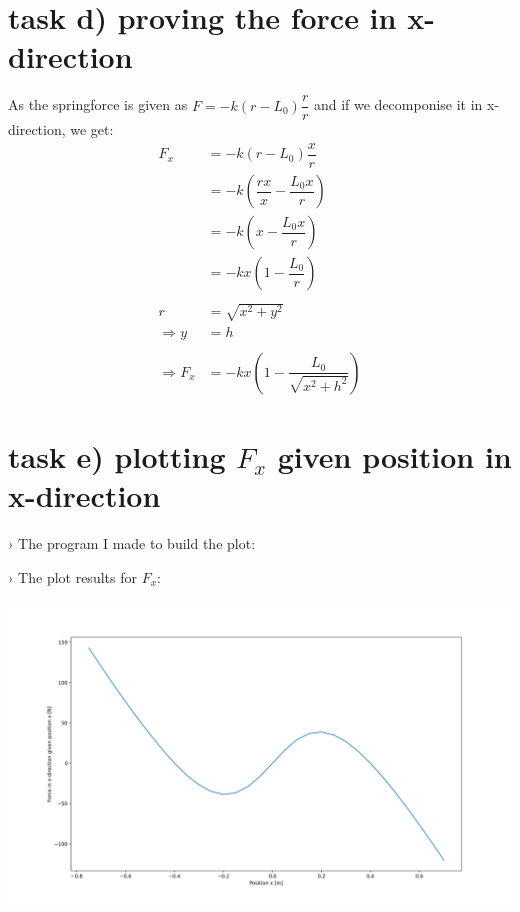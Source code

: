 \documentclass{article}
\begin{document}
    \section*{task d) proving the force in x-direction}
    As the springforce is given as \(F = -k(r-L_0)\dfrac{r}{r}\) and if we decomponise it in 
    x-direction, we get:
    \begin{equation*}
        \begin{split}
            F_x &= -k(r-L_0)\dfrac{x}{r} \\
                &= -k(\dfrac{rx}{x}-\dfrac{L_0x}{r}) \\
                &= -k(x-\dfrac{L_0x}{r}) \\
                &= -kx(1-\dfrac{L_0}{r}) \\
                \\
                r &= \sqrt{x^2 + y^2} \\
                \Rightarrow y &= h \\
                \\
                \Rightarrow F_x &= -kx(1-\dfrac{L_0}{\sqrt{x^2+h^2}})
        \end{split}
    \end{equation*}

    \section*{task e) plotting \(F_x\) given position in x-direction}
    › The program I made to build the plot:
    
    \pagebreak
    › The plot results for \(F_x\):
    \begin{center}
        \includegraphics[scale=0.45]{../fx-plot.png}\linebreak
    \end{center}
\end{document}
